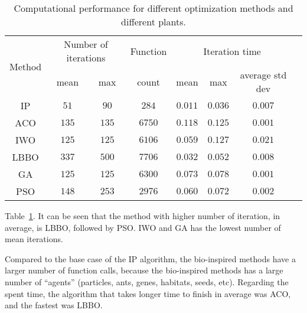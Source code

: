 \begin{table}[tb]%
	\centering
	\caption{Computational performance for different optimization methods and different plants.}\vspace{1mm}
	\begin{tabular}{cccccccc}
		\toprule
		\multirow{2}{*}{Method} & \multicolumn{2}{c}{Number of iterations}& Function & \multicolumn{3}{c}{Iteration time}\\
		\cline{2-3} \cline{5-7}
		& mean & max & count & mean & max & average std dev\\
		\midrule
		IP & $51$ & $90$ & $284$ & $0.011$ & $0.036$ & $0.007$ \\
		ACO & $135$ & $135$ & $6750$ & $0.118$ & $0.125$ & $0.001$\\
		IWO & $125$ & $125$ & $6106$ & $0.059$ & $0.127$ & $0.021$\\
		LBBO & $337$ & $500$ & $7706$ & $0.032$ & $0.052$ & $0.008$\\
		GA & $125$ & $125$ & $6300$ & $0.073$ & $0.078$ & $0.001$\\
		PSO & $148$ & $253$ & $2976$ & $0.060$ & $0.072$ & $0.002$\\
		\bottomrule 
	\end{tabular}
	\label{tab:Results01}
\end{table}
%
Table~\ref{tab:Results01}. It can be seen that the method with higher number of iteration, in average, is LBBO, followed by PSO. IWO and GA has the lowest number of mean iterations.

Compared to the base case of the IP algorithm, the bio-inspired methods have a larger number of function calls, because the bio-inspired methods has a large number of ``agents'' (particles, ants, genes, habitats, seeds, etc).
Regarding the spent time, the algorithm that takes longer time to finish in average was ACO, and the fastest was LBBO.

